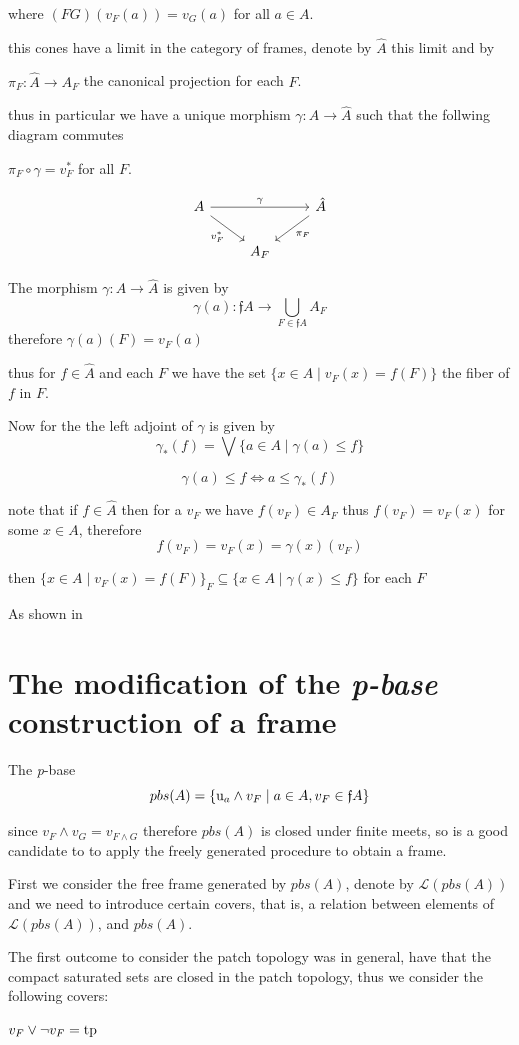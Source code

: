 \documentclass[11pt]{amsart}
\theoremstyle{plain}
\theoremstyle{definition}
\begin{document}
where $(FG)(v_{F}(a))=v_{G}(a)$ for all $a\in A$.

this cones have a limit in the category of frames, denote by $\hat{A}$ this limit and by 

$\pi_{F}\colon \hat{A}\rightarrow A_{F}$ the canonical projection for each $F$.

thus in particular we have a unique morphism $\gamma\colon A \rightarrow \hat{A}$ such that 
the follwing diagram commutes

$\pi_{F}\circ \gamma=v_{F}^{*}$ for all $F$.


\[
\begin{tikzcd}
   A\ar[rr, "\gamma"] \ar[rd, "v_{F}^{*}"']  &  & \hat{A} \ar[ld, "\pi_{F}"]\\
                 & A_{F} &
\end{tikzcd}
\]


The morphism $\gamma\colon A\rightarrow \hat{A}$ is given by \[\gamma(a)\colon\mathfrak{f}A\rightarrow \bigcup_{F\in\mathfrak{f}A} A_{F}\] therefore $\gamma(a)(F)=v_{F}(a)$


thus for $f\in\hat{A}$ and each $F$ we have the set $\{x\in A\mid v_{F}(x)=f(F)\}$ the fiber of $f$ in $F$.

Now for the the left adjoint of $\gamma$ is given by \[\gamma_{*}(f)=\bigvee\{a\in A\mid \gamma(a)\leq f\}\]

\[\gamma(a)\leq f\Leftrightarrow a\leq\gamma_{*}(f)\]

note that if  $f\in\hat{A}$ then for a $v_{F}$ we have $f(v_{F})\in A_{F}$ thus $f(v_{F})=v_{F}(x)$ for some $x\in A$, therefore \[f(v_{F})=v_{F}(x)=\gamma(x)(v_{F})\]  

then $\{x\in A\mid v_{F}(x)=f(F)\}_{F}\subseteq\{x\in A\mid \gamma(x)\leq f\}$ for each $F$

As shown in \cite{escardo2001regular}


\section{The modification of the \textit{p-base} construction of a frame}


The \textit{p}-base \[pbs(A)=\{{\rm u}_{a}\wedge v_{F}\mid a\in A, v_{F}\in\mathfrak{f}A\}\]

since $v_{F}\wedge v_{G}=v_{F\wedge G}$ therefore $pbs(A)$ is closed under finite meets, so is a good candidate to 
to apply the freely generated procedure to obtain a frame.

First we consider the free frame generated by $pbs(A)$, denote by $\mathcal{L}(pbs(A))$ and we need to introduce certain 
covers, that is, a relation between elements of $\mathcal{L}(pbs(A))$, and $pbs(A)$.


The first outcome to consider the patch topology was in general, have that the compact
 saturated sets are closed in the patch topology,
 thus we consider the following covers:

$v_{F}\vee\neg v_{F}={\rm tp}$





\end{document}
